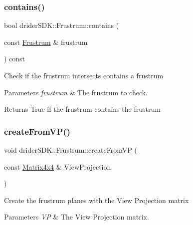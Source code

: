 \subsubsection{\texorpdfstring{contains()}{contains()}\hspace{0.1cm}{\footnotesize\ttfamily [5/5]}}
{\footnotesize\ttfamily bool drider\+S\+D\+K\+::\+Frustrum\+::contains (\begin{DoxyParamCaption}\item[{const \hyperlink{classdrider_s_d_k_1_1_frustrum}{Frustrum} \&}]{frustrum }\end{DoxyParamCaption}) const}

Check if the frustrum intersects contains a frustrum


\begin{DoxyParams}{Parameters}
{\em frustrum} & The frustrum to check.\\
\hline
\end{DoxyParams}
\begin{DoxyReturn}{Returns}
True if the frustrum contains the frustrum 
\end{DoxyReturn}
\mbox{\label{classdrider_s_d_k_1_1_frustrum_a852e86146dc8621a99c5581e03d587de}} 
\subsubsection{\texorpdfstring{create\+From\+V\+P()}{createFromVP()}}
{\footnotesize\ttfamily void drider\+S\+D\+K\+::\+Frustrum\+::create\+From\+VP (\begin{DoxyParamCaption}\item[{const \hyperlink{classdrider_s_d_k_1_1_matrix4x4}{Matrix4x4} \&}]{View\+Projection }\end{DoxyParamCaption})}

Create the frustrum planes with the View Projection matrix


\begin{DoxyParams}{Parameters}
{\em VP} & The View Projection matrix. \\
\hline
\end{DoxyParams}
\mbox{\label{classdrider_s_d_k_1_1_frustrum_ad81116f896faad5acada10c16c3e7518}} 
